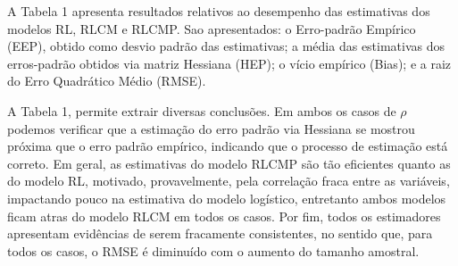 \documentclass[10pt, a4paper]{article}
\begin{document}
A Tabela 1 apresenta resultados relativos ao desempenho das estimativas dos modelos RL, RLCM e RLCMP. Sao apresentados: o Erro-padrão Empírico (EEP), obtido como desvio padrão das estimativas; a média das estimativas dos erros-padrão obtidos via matriz Hessiana (HEP); o vício empírico (Bias); e a raiz do Erro Quadrático Médio (RMSE).

A Tabela 1, permite extrair diversas conclusões. Em ambos os casos de $\rho$ podemos verificar que a estimação do erro padrão via Hessiana se mostrou próxima que o erro padrão empírico, indicando que o processo de estimação está correto. Em geral, as estimativas do modelo RLCMP são tão eficientes quanto as do modelo RL, motivado, provavelmente, pela correlação fraca entre as variáveis, impactando pouco na estimativa do modelo logístico, entretanto ambos modelos ficam atras do modelo RLCM em todos os casos. Por fim, todos os estimadores apresentam evidências de serem fracamente consistentes, no sentido que, para todos os casos, o RMSE é diminuído com o aumento do tamanho amostral.
\end{document}
